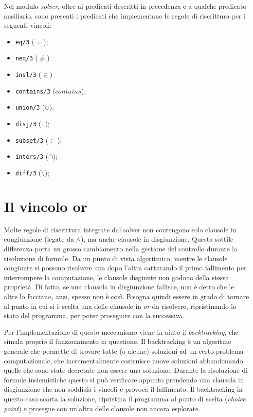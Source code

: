 \documentclass[12pt,a4paper,openright]{book}  %
\begin{document}
Nel modulo \emph{solver}, oltre ai predicati descritti in precedenza e
a qualche predicato ausiliario, sono presenti i predicati che
implementano le regole di riscrittura per i seguenti vincoli:
\begin{itemize}
\item \verb|eq/3| ($=$);
\item \verb|neq/3| ($\neq$)
\item \verb|insl/3| ($\in$)
\item \verb|contains/3| ($contains$);
\item \verb|union/3| ($\cup$);
\item \verb|disj/3| ($||$);
\item \verb|subset/3| ($\subset$);
\item \verb|inters/3| ($\cap$);
\item \verb|diff/3| ($\setminus$);
\end{itemize}

\section{Il vincolo or}
\label{sec:lsetpicat_or}

Molte regole di riscrittura integrate dal solver non contengono solo
clausole in congiunzione (legate da $\land$), ma anche clausole in
disgiunzione. Questa sottile differenza porta un grosso cambiamento
nella gestione del controllo durante la risoluzione di formule. Da un
punto di vista algoritmico, mentre le clausole congiunte si possono
risolvere una dopo l'altra catturando il primo fallimento per
interrompere la computazione, le clausole disgiunte non godono della
stessa proprietà. Di fatto, se una clausola in disgiunzione fallisce,
non è detto che le altre lo facciano, anzi, spesso non è così. Bisogna
quindi essere in grado di tornare al punto in cui si è scelta una
delle clausole in \emph{or} da risolvere, ripristinando lo stato del
programma, per poter proseguire con la successiva.

Per l'implementazione di questo meccanismo viene in aiuto il
\emph{backtracking}, che simula proprio il funzionamento in
questione. Il backtracking è un algoritmo generale che permette di
trovare tutte (o alcune) soluzioni ad un certo problema
computazionale, che incrementalmente costruisce nuove soluzioni
abbandonando quelle che sono state decretate non essere una
soluzione. Durante la risoluzione di formule insiemistiche questo si
può verificare appunto prendendo una clausola in disgiunzione che non
soddisfa i vincoli e provoca il fallimento. Il backtracking in questo
caso scarta la soluzione, ripristina il programma al punto di scelta
(\emph{choice point}) e prosegue con un'altra delle clausole
non ancora esplorate.
\end{document}
